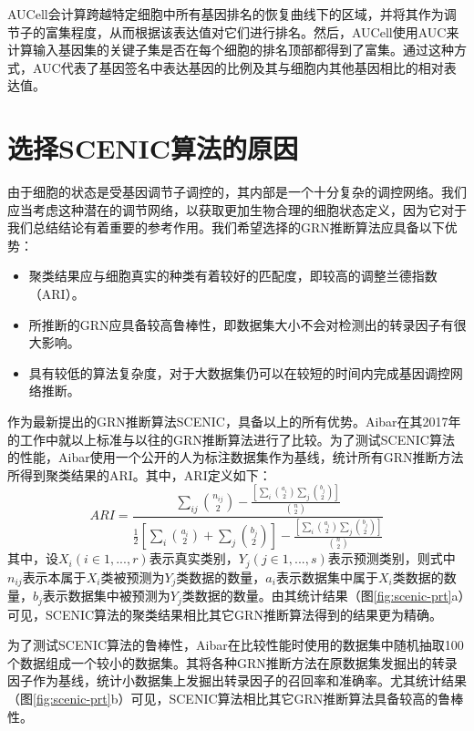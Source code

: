   AUCell会计算跨越特定细胞中所有基因排名的恢复曲线下的区域，并将其作为调节子的富集程度，从而根据该表达值对它们进行排名。然后，AUCell使用AUC来计算输入基因集的关键子集是否在每个细胞的排名顶部都得到了富集。通过这种方式，AUC代表了基因签名中表达基因的比例及其与细胞内其他基因相比的相对表达值。

\section{选择SCENIC算法的原因}
  由于细胞的状态是受基因调节子调控的，其内部是一个十分复杂的调控网络。我们应当考虑这种潜在的调节网络，以获取更加生物合理的细胞状态定义，因为它对于我们总结结论有着重要的参考作用。我们希望选择的GRN推断算法应具备以下优势：
\begin{itemize}
  \item 聚类结果应与细胞真实的种类有着较好的匹配度，即较高的调整兰德指数（ARI）。
  \item 所推断的GRN应具备较高鲁棒性，即数据集大小不会对检测出的转录因子有很大影响。
  \item 具有较低的算法复杂度，对于大数据集仍可以在较短的时间内完成基因调控网络推断。
\end{itemize}

  作为最新提出的GRN推断算法SCENIC，具备以上的所有优势。Aibar在其2017年的工作\cite{aibar2017scenic}中就以上标准与以往的GRN推断算法进行了比较。为了测试SCENIC算法的性能，Aibar使用一个公开的人为标注数据集作为基线，统计所有GRN推断方法所得到聚类结果的ARI。其中，ARI定义如下：
\begin{equation}
  ARI = \frac{{\sum}_{ij}\binom{n_{ij}}{2} - \frac{\left[{\sum}_{i}\binom{a_{i}}{2}{\sum}_{j}\binom{b_{j}}{2}\right]}{\binom{n}{2}}}{\frac{1}{2}\left[{\sum}_{i}\binom{a_{i}}{2}+{\sum}_{j}\binom{b_{j}}{2}\right]-\frac{\left[{\sum}_{i}\binom{a_{i}}{2}{\sum}_{j}\binom{b_{j}}{2}\right]}{\binom{n}{2}}}
\end{equation}
其中，设$X_{i}(i\in{1,...,r})$表示真实类别，$Y_{j}(j\in{1,...,s})$表示预测类别，则式中$n_{ij}$表示本属于$X_{i}$类被预测为$Y_{j}$类数据的数量，$a_{i}$表示数据集中属于$X_{i}$类数据的数量，$b_{j}$表示数据集中被预测为$Y_{j}$类数据的数量。由其统计结果（图\ref{fig:scenic-prt}a）可见，SCENIC算法的聚类结果相比其它GRN推断算法得到的结果更为精确。

  为了测试SCENIC算法的鲁棒性，Aibar在比较性能时使用的数据集中随机抽取100个数据组成一个较小的数据集。其将各种GRN推断方法在原数据集发掘出的转录因子作为基线，统计小数据集上发掘出转录因子的召回率和准确率。尤其统计结果（图\ref{fig:scenic-prt}b）可见，SCENIC算法相比其它GRN推断算法具备较高的鲁棒性。

